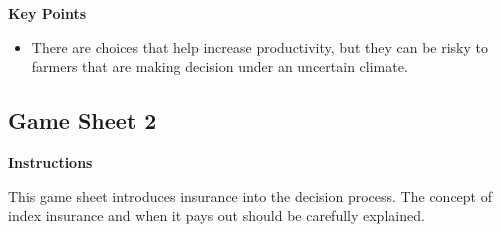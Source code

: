 \documentclass[letterpaper,10pt,english]{sphinxmanual}
\begin{document}
\textbf{Key Points}
\begin{itemize}
\item {} 
There are choices that help increase productivity, but they can be risky to farmers that are making decision under an uncertain climate.

\end{itemize}


\subsection{Game Sheet 2}
\label{games/gameinstructions_quickreference_en:game-sheet-2}\begin{figure}[htbp]
\centering

\end{figure}

\textbf{Instructions}

This game sheet introduces insurance into the decision process. The concept of index insurance and when it pays out should be carefully explained.
\end{document}

